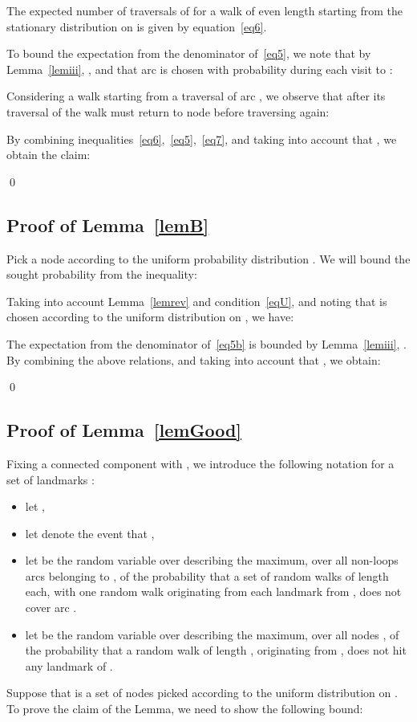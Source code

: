 \documentclass[11pt,a4paper]{article}
\renewcommand{\*}{\hspace*{5mm}}
\begin{document}
The expected number of traversals of  for a walk of even length starting from the stationary distribution on  is given by equation~\eqref{eq6}.

To bound the expectation from the denominator of~\eqref{eq5}, we note that by Lemma~\ref{lemiii},  , and that arc  is chosen with probability  during each visit to :

Considering a walk starting from a traversal of arc , we observe that after its traversal of   the walk must return to node  before traversing  again:


By combining inequalities~\eqref{eq6},~\eqref{eq5},~\eqref{eq7}, and taking into account that , we obtain the claim:

\qed


\subsection*{Proof of Lemma~\ref{lemB}}

Pick a node  according to the uniform probability distribution . We will bound the sought probability from the inequality:

Taking into account Lemma~\ref{lemrev} and condition~\eqref{eqU}, and noting that  is chosen according to the uniform distribution  on , we have:

The expectation from the denominator of~\eqref{eq5b} is bounded by Lemma~\ref{lemiii}, . By combining the above relations, and taking into account that , we obtain:

\qed

\subsection*{Proof of Lemma~\ref{lemGood}}

Fixing a connected component  with , we introduce the following notation for a set of landmarks :
\begin{itemize}
\item let ,
\item let  denote the event that ,
\item let  be the random variable over  describing the maximum, over all non-loops arcs  belonging to , of the probability that a set of  random walks  of length  each, with one random walk originating from each landmark from , does not cover arc .
\item let  be the random variable over  describing the maximum, over all nodes , of the probability that a random walk  of length , originating from , does not hit any landmark of .
\end{itemize}
Suppose that  is a set of  nodes picked according to the uniform distribution  on . To prove the claim of the Lemma, we need to show the following bound:
\end{document}
